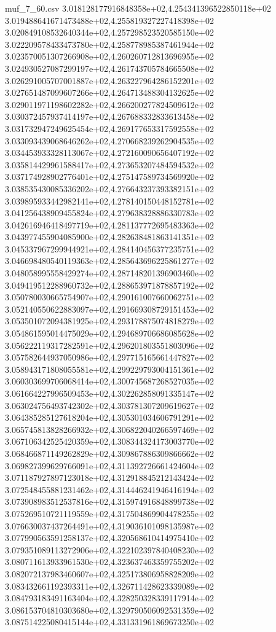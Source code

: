 \begin{filecontents*}{muf_7_60.csv}
3.018128177916848358e+02,4.254341396522850118e+02
3.019488641671473488e+02,4.255819327227418398e+02
3.020849108532640344e+02,4.257298523520585150e+02
3.022209578433473780e+02,4.258778985387461944e+02
3.023570051307266908e+02,4.260260712813696955e+02
3.024930527087299197e+02,4.261743705784665508e+02
3.026291005707001887e+02,4.263227964286152201e+02
3.027651487099607266e+02,4.264713488304132625e+02
3.029011971198602282e+02,4.266200277824509612e+02
3.030372457937414197e+02,4.267688332833613458e+02
3.031732947249625454e+02,4.269177653317592558e+02
3.033093439068646262e+02,4.270668239262904535e+02
3.034453933328113067e+02,4.272160090656407192e+02
3.035814429961588417e+02,4.273653207484594532e+02
3.037174928902776401e+02,4.275147589734569920e+02
3.038535430085336202e+02,4.276643237393382151e+02
3.039895933442982141e+02,4.278140150448152781e+02
3.041256438909455824e+02,4.279638328886330783e+02
3.042616946418497719e+02,4.281137772695483363e+02
3.043977455904085900e+02,4.282638481863141351e+02
3.045337967299944921e+02,4.284140456377235751e+02
3.046698480540119363e+02,4.285643696225861277e+02
3.048058995558429274e+02,4.287148201396903460e+02
3.049419512288960732e+02,4.288653971878857192e+02
3.050780030665754907e+02,4.290161007660062751e+02
3.052140550622883097e+02,4.291669308729151453e+02
3.053501072094381925e+02,4.293178875074818279e+02
3.054861595014475029e+02,4.294689706686085628e+02
3.056222119317282591e+02,4.296201803551803096e+02
3.057582644937050986e+02,4.297715165661447827e+02
3.058943171808055581e+02,4.299229793004151361e+02
3.060303699706068414e+02,4.300745687268527035e+02
3.061664227996509453e+02,4.302262858091335147e+02
3.063024756493742302e+02,4.303781307209619627e+02
3.064385285127618204e+02,4.305301034606791291e+02
3.065745813828266932e+02,4.306822040266597469e+02
3.067106342525420359e+02,4.308344324173003770e+02
3.068466871149262829e+02,4.309867886309866662e+02
3.069827399629766091e+02,4.311392726661424604e+02
3.071187927897123018e+02,4.312918845212143424e+02
3.072548455881231462e+02,4.314446241946416194e+02
3.073908983512537816e+02,4.315974916848899738e+02
3.075269510721119559e+02,4.317504869904478255e+02
3.076630037437264491e+02,4.319036101098135987e+02
3.077990563591258137e+02,4.320568610414975410e+02
3.079351089113272906e+02,4.322102397840408230e+02
3.080711613933961530e+02,4.323637463359755202e+02
3.082072137983460607e+02,4.325173806958828209e+02
3.083432661192393311e+02,4.326711428623339089e+02
3.084793183491163404e+02,4.328250328339117914e+02
3.086153704810303680e+02,4.329790506092531359e+02
3.087514225080415144e+02,4.331331961869673250e+02

\end{filecontents*}
